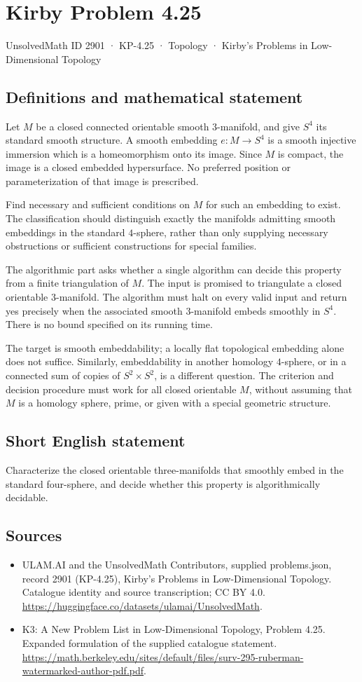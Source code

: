 \documentclass[11pt,a4paper]{article}
\begin{document}
\section*{Kirby Problem 4.25}\label{2901}
{\small UnsolvedMath ID 2901 · KP-4.25 · Topology · Kirby's Problems in Low-Dimensional Topology}
\subsection{Definitions and mathematical statement}
Let $M$ be a closed connected orientable smooth $3$-manifold, and give
$S^4$ its standard smooth structure. A smooth embedding $e:M\to S^4$
is a smooth injective immersion which is a homeomorphism onto its
image. Since $M$ is compact, the image is a closed embedded
hypersurface. No preferred position or parameterization of that image
is prescribed.

Find necessary and sufficient conditions on $M$ for such an embedding
to exist. The classification should distinguish exactly the manifolds
admitting smooth embeddings in the standard $4$-sphere, rather than
only supplying necessary obstructions or sufficient constructions for
special families.

The algorithmic part asks whether a single algorithm can decide this
property from a finite triangulation of $M$. The input is promised
to triangulate a closed orientable $3$-manifold. The algorithm must
halt on every valid input and return yes precisely when the associated
smooth $3$-manifold embeds smoothly in $S^4$. There is no bound
specified on its running time.

The target is smooth embeddability; a locally flat topological embedding
alone does not suffice. Similarly, embeddability in another homology
$4$-sphere, or in a connected sum of copies of $S^2\times S^2$,
is a different question. The criterion and decision procedure must
work for all closed orientable $M$, without assuming that $M$ is a
homology sphere, prime, or given with a special geometric structure.
\subsection{Short English statement}
Characterize the closed orientable three-manifolds that smoothly embed in the standard four-sphere, and decide whether this property is algorithmically decidable.
\subsection{Sources}
\begin{itemize}
\item[S1] ULAM.AI and the UnsolvedMath Contributors, supplied problems.json, record 2901 (KP-4.25), Kirby's Problems in Low-Dimensional Topology. Catalogue identity and source transcription; CC BY 4.0.
\url{https://huggingface.co/datasets/ulamai/UnsolvedMath}.
\item[S2] K3: A New Problem List in Low-Dimensional Topology, Problem 4.25. Expanded formulation of the supplied catalogue statement.
\url{https://math.berkeley.edu/sites/default/files/surv-295-ruberman-watermarked-author-pdf.pdf}.
\end{itemize}
\end{document}
